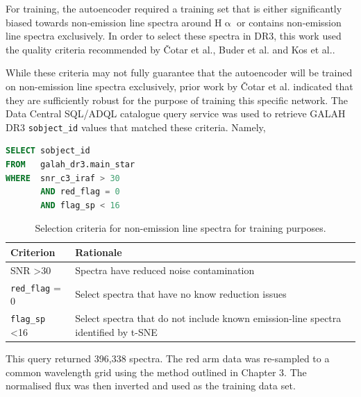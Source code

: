 For training, the autoencoder required a training set that is either significantly biased towards non-emission line spectra around H$\upalpha$ or contains non-emission line spectra exclusively. In order to select these spectra in DR3, this work used the quality criteria recommended by Čotar et al.\cite{vcotar2021galah}, Buder et al.\cite{buder2021galah+} and Kos et al.\cite{kos2017galah}. 

While these criteria may not fully guarantee that the autoencoder will be trained on non-emission line spectra exclusively, prior work by Čotar et al. indicated that they are sufficiently robust for the purpose of training this specific network. The Data Central SQL/ADQL catalogue query service was used to retrieve GALAH DR3 \texttt{sobject\_id} values that matched these criteria. Namely,

\begin{lstlisting}[language=SQL]
SELECT sobject_id
FROM   galah_dr3.main_star
WHERE  snr_c3_iraf > 30
       AND red_flag = 0
       AND flag_sp < 16 
\end{lstlisting}

\begin{table}[!htb]
\begin{center}
\begin{tabular}{|l|l|}
\hline
\textbf{Criterion}    & \textbf{Rationale}                                                                 \\ \hline
SNR \textgreater 30   & Spectra have reduced noise contamination      \\ \hline
\texttt{red\_flag} = 0         & Select spectra that have no know reduction issues                                  \\ \hline
\texttt{flag\_sp} \textless 16 & Select spectra that do not include known emission-line spectra identified by t-SNE \\ \hline
\end{tabular}
\caption{Selection criteria for non-emission line spectra for training purposes.}
\label{table:Selection Criteria}
\end{center}
\end{table}

This query returned 396,338 spectra. The red arm data was re-sampled to a common wavelength grid using the method outlined in Chapter 3. The normalised flux was then inverted and used as the training data set.

